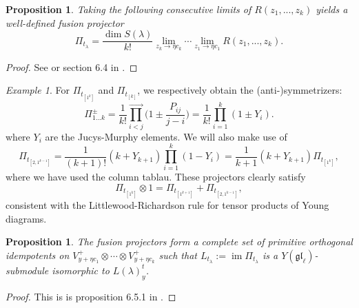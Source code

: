 \documentclass[11pt]{report}
\newtheorem{prop}[theorem]{Proposition}
\theoremstyle{definition}
\theoremstyle{remark}
\theoremstyle{remark}
\newtheorem*{example}{Example}
\begin{document}
\begin{prop}\label{prop:fusionDecomposition}
Taking the following consecutive limits of $R(z_1,...,z_k)$ yields a well-defined \emph{fusion projector}
\begin{equation*}
\Pi_{t_\lambda} = \frac{\dim S(\lambda)}{k!} \lim_{z_k \to \eta c_k} \cdots \lim_{z_1 \to \eta c_1} R(z_1,...,z_k).
\end{equation*}
\end{prop}

\begin{proof}
See \cite{article:molev:2008} or section 6.4 in \cite{book:molev}.
\end{proof}

\begin{example}
For $\Pi_{t_{[1^k]}}$ and $\Pi_{t_{[k]}}$, we respectively obtain the (anti-)symmetrizers:
\begin{equation*}
\Pi_{1...k}^\pm = \frac{1}{k!} \overset{\longrightarrow}{\prod_{i < j}} \bigg( 1 \pm \frac{P_{ij}}{j-i} \bigg) = \frac{1}{k!} \prod_{i=1}^k (1 \pm Y_i).
\end{equation*}
where $Y_i$ are the Jucys-Murphy elements. We will also make use of
\begin{equation}\label{equation:hookProjector}
\Pi_{t_{[2,1^{k-1}]}} = \frac{1}{(k+1)!} (k+Y_{k+1}) \prod_{i=1}^k (1-Y_i) = \frac{1}{k+1} (k + Y_{k+1}) \Pi_{t_{[1^k]}},
\end{equation}
where we have used the column tablau. These projectors clearly satisfy
\begin{equation}\label{equation:LRRule}
\Pi_{t_{[1^k]}} \otimes 1 = \Pi_{t_{[1^{k+1}]}} + \Pi_{t_{[2,1^{k-1}]}},
\end{equation}
consistent with the Littlewood-Richardson rule for tensor products of Young diagrams.
\end{example}

\begin{prop}
The fusion projectors form a complete set of primitive orthogonal idempotents on $V_{y+\eta c_1}^+ \otimes \cdots \otimes V_{y+\eta c_k}^+$ such that $L_{t_\lambda} := \operatorname{im} \Pi_{t_\lambda}$ is a $Y(\mathfrak{gl}_\ell)$-submodule isomorphic to $L(\lambda)_y^t$.
\end{prop}

\begin{proof}
This is is proposition 6.5.1 in \cite{book:molev}.
\end{proof}
\end{document}
